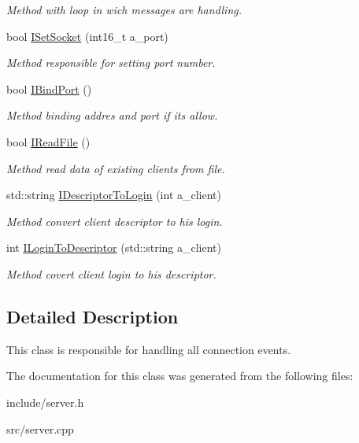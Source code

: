 \begin{DoxyCompactItemize}
\begin{DoxyCompactList}\small\item\em Method with loop in wich messages are handling. \end{DoxyCompactList}\item 
bool \hyperlink{classServer_a80089a729a3664bf580c27ae5a86d691}{I\+Set\+Socket} (int16\+\_\+t a\+\_\+port)\hypertarget{classServer_a80089a729a3664bf580c27ae5a86d691}{}\label{classServer_a80089a729a3664bf580c27ae5a86d691}

\begin{DoxyCompactList}\small\item\em Method responsible for setting port number. \end{DoxyCompactList}\item 
bool \hyperlink{classServer_a4d95b9a38864072084277bb84421475e}{I\+Bind\+Port} ()\hypertarget{classServer_a4d95b9a38864072084277bb84421475e}{}\label{classServer_a4d95b9a38864072084277bb84421475e}

\begin{DoxyCompactList}\small\item\em Method binding addres and port if it\textquotesingle{}s allow. \end{DoxyCompactList}\item 
bool \hyperlink{classServer_a38db28c597e4759fba3dc831462ba3f3}{I\+Read\+File} ()\hypertarget{classServer_a38db28c597e4759fba3dc831462ba3f3}{}\label{classServer_a38db28c597e4759fba3dc831462ba3f3}

\begin{DoxyCompactList}\small\item\em Method read data of existing clients from file. \end{DoxyCompactList}\item 
std\+::string \hyperlink{classServer_ac3697709d2f04345928e0ee2ec2b71d0}{I\+Descriptor\+To\+Login} (int a\+\_\+client)\hypertarget{classServer_ac3697709d2f04345928e0ee2ec2b71d0}{}\label{classServer_ac3697709d2f04345928e0ee2ec2b71d0}

\begin{DoxyCompactList}\small\item\em Method convert client descriptor to his login. \end{DoxyCompactList}\item 
int \hyperlink{classServer_a1e9fccb595bba3c40bf11485e369eae4}{I\+Login\+To\+Descriptor} (std\+::string a\+\_\+client)\hypertarget{classServer_a1e9fccb595bba3c40bf11485e369eae4}{}\label{classServer_a1e9fccb595bba3c40bf11485e369eae4}

\begin{DoxyCompactList}\small\item\em Method covert client login to his descriptor. \end{DoxyCompactList}\end{DoxyCompactItemize}


\subsection{Detailed Description}
This class is responsible for handling all connection events. 

The documentation for this class was generated from the following files\+:\begin{DoxyCompactItemize}
\item 
include/server.\+h\item 
src/server.\+cpp\end{DoxyCompactItemize}
